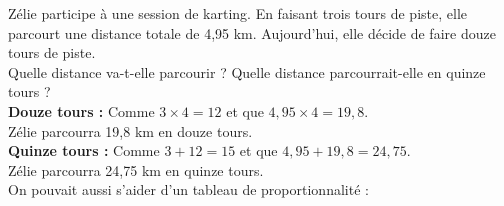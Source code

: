 \begin{Méthode}

Zélie participe à une session de karting. En faisant trois tours de piste, elle parcourt une distance totale de 4,95 km. Aujourd'hui, elle décide de faire douze tours de piste. \\
Quelle distance va-t-elle parcourir ? Quelle distance parcourrait-elle en quinze tours ?\\
\textbf{Douze tours :} Comme $3 \times 4 = 12$ et que $4,95 \times 4 = 19,8$.\\ Zélie parcourra 19,8 km en douze tours.\\ 
\textbf{Quinze tours :} Comme $3 + 12 = 15$ et que  $ 4,95 + 19,8 = 24,75$. \\Zélie parcourra 24,75 km en quinze tours.\\

On pouvait aussi s'aider d'un tableau de proportionnalité : 
\begin{center}
\end{center}
\end{Méthode}
